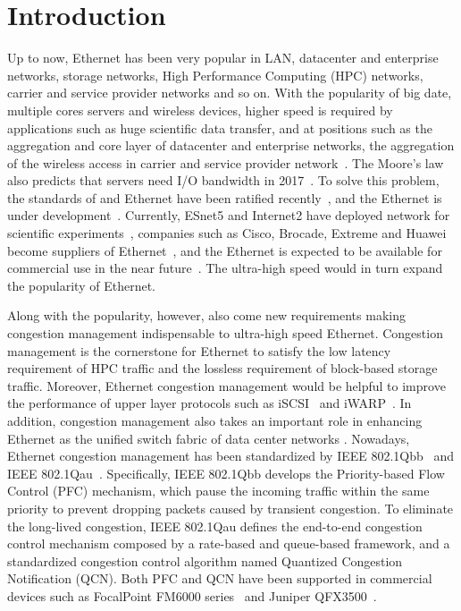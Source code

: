 \documentclass{sig-alternate-10pt}
\begin{document}
\section{Introduction}

Up to now, Ethernet has been very popular in LAN, datacenter and enterprise networks, storage networks, High Performance Computing (HPC) networks, carrier and service provider networks and so on. With the popularity of big date, multiple cores servers and wireless devices, higher speed is required by applications such as huge scientific data transfer, and at positions such as the aggregation and core layer of datacenter and enterprise networks, the aggregation of the wireless access in carrier and service provider network~\cite{roadmap}. The Moore's law also predicts that servers need  I/O bandwidth in 2017~\cite{commercial}. To solve this problem, the standards of  and  Ethernet have been ratified recently~\cite{100G}, and the  Ethernet is under development~\cite{400G}. Currently, ESnet5 and Internet2 have deployed  network for scientific experiments~\cite{ESnet5}, companies such as Cisco, Brocade, Extreme and Huawei become suppliers of  Ethernet~\cite{extreme}, and the  Ethernet is expected to be available for commercial use in the near future~\cite{commercial}. The ultra-high speed would in turn expand the popularity of Ethernet.


Along with the popularity, however, also come new requirements making congestion management indispensable to ultra-high speed Ethernet. Congestion management is the cornerstone for Ethernet to satisfy the low latency requirement of HPC traffic and the lossless requirement of block-based storage traffic. Moreover, Ethernet congestion management would be helpful to improve the performance of upper layer protocols such as iSCSI~\cite{iSCSI} and iWARP~\cite{iWARP}. In addition, congestion management also takes an important role in enhancing Ethernet as the unified switch fabric of data center networks . Nowadays, Ethernet congestion management has been standardized by IEEE 802.1Qbb~\cite{802.1Qbb} and IEEE 802.1Qau~\cite{802.1Qau}. Specifically, IEEE 802.1Qbb develops the Priority-based Flow Control (PFC) mechanism, which pause the incoming traffic within the same priority to prevent dropping packets caused by transient congestion. To eliminate the long-lived congestion, IEEE 802.1Qau defines the end-to-end congestion control mechanism composed by a rate-based and queue-based framework, and a standardized congestion control algorithm named Quantized Congestion Notification (QCN). Both PFC and QCN have been supported in commercial devices such as FocalPoint FM6000 series~\cite{FM6000} and Juniper QFX3500~\cite{QFX}.
\end{document}
